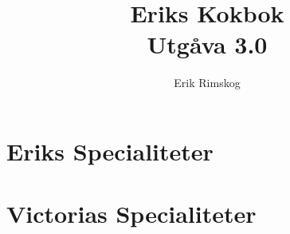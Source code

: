 \documentclass[12pt,a4paper]{article}
\title{\Huge Eriks Kokbok\\\medskip
  \large Utgåva 3.0\\\smallskip
  \small\texttt\shortHEAD}
\author{Erik Rimskog}
\newcommand{\includerecipe}[1]{}
\begin{document}
\maketitle
\thispagestyle{empty}
\newpage
\tableofcontents
\newpage
\part{Eriks Specialiteter}
\includerecipe{korvstroganoff}
\includerecipe{pannkakor}
\includerecipe{carbonara}

\part{Victorias Specialiteter}
\includerecipe{linscurry}
\end{document}
